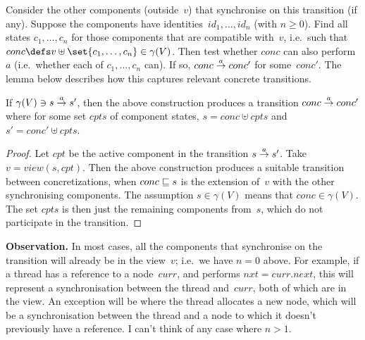 Consider the other components (outside~$v$) that synchronise on this
transition (if any).  Suppose the components have identities~$id_1, \ldots,
id_n$ (with $n \ge 0$).  Find all states $c_1, \ldots, c_n$ for those
components that are compatible with~$v$, i.e.\ such that $conc \defs v \uplus
\set{c_1,\ldots,c_n} \in \gamma(V)$.  Then test whether $conc$ can
also perform~$a$ (i.e.~whether each of $c_1,\ldots, c_n$ can).  If so, $conc
\stackrel{a}\rightarrow conc'$ for some~$conc'$.  The lemma below describes how this
captures relevant concrete transitions.
\begin{lemma}
If \( \gamma(V) \ni s \stackrel{a}\rightarrow s' \), then the above construction produces a
transition $conc \stackrel{a}\rightarrow conc'$ where for some set $cpts$ of component
states, $s = conc \uplus cpts$ and $s' = conc' \uplus cpts$.
\end{lemma}
\begin{proof}
Let $cpt$ be the active component in the transition $s \stackrel{a}\rightarrow s'$.  Take $v
= view(s, cpt)$.  Then the above construction produces a suitable transition
between concretizations, when $conc \sqsubseteq s$ is the extension of~$v$ with the
other synchronising components.  The assumption $s \in \gamma(V)$ means that
$conc \in \gamma(V)$.  The set $cpts$ is then just the remaining components
from~$s$, which do not participate in the transition.
\end{proof}



\textbf{Observation.} In most cases, all the components that synchronise on
the transition will already be in the view~$v$; i.e.~we have $n = 0$ above.
For example, if a thread has a reference to a node~$curr$, and performs $nxt =
curr.next$, this will represent a synchronisation between the thread
and~$curr$, both of which are in the view.  An exception will be where the
thread allocates a new node, which will be a synchronisation between the
thread and a node to which it doesn't previously have a reference.  I can't
think of any case where $n > 1$.




